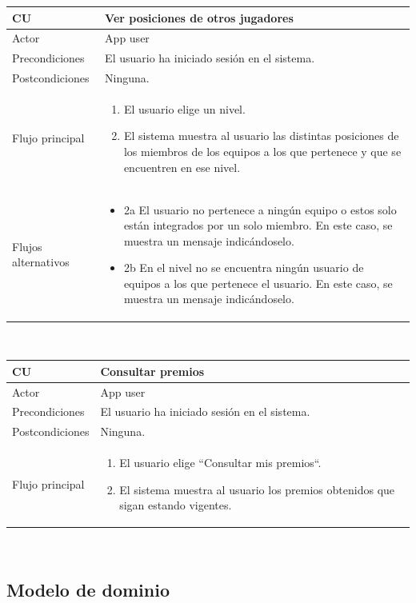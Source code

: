 \documentclass[twoside]{report}
\newcommand\addrow[2]{#1 &#2\\ }
\newcommand\addheading[2]{#1 &#2\\ \hline}
\newcommand\tabularhead{\begin{tabular}{lp{0.7\textwidth}}
\hline
}
\newenvironment{usecase}{\tabularhead}
{\hline\end{tabular}}
\begin{document}
\begin{usecase}
  \addheading{\textbf{CU\arabic{usecase}}}{Ver posiciones de otros jugadores} 
  \addrow{Actor}{App user}
  \addrow{Precondiciones}{El usuario ha iniciado sesión en el sistema.}
  \addrow{Postcondiciones}{Ninguna.}
  \addrow{Flujo principal}{
  		\begin{enumerate}
  		\item El usuario elige un nivel.
  		\item El sistema muestra al usuario las distintas posiciones de los miembros de los equipos a los que pertenece y que se encuentren en ese nivel.
  		\end{enumerate}
  }
  \addrow{Flujos alternativos}{
  		\begin{itemize}
  		\item 2a El usuario no pertenece a ningún equipo o estos solo están integrados por un solo miembro. En este caso,  se muestra un mensaje indicándoselo.
  		\item 2b En el nivel no se encuentra ningún usuario de equipos a los que pertenece el usuario. En este caso, se muestra un mensaje indicándoselo.
  		\end{itemize}
  }
\end{usecase}\\

\begin{usecase}
  \addheading{\textbf{CU\arabic{usecase}}}{Consultar premios} 
  \addrow{Actor}{App user}
  \addrow{Precondiciones}{El usuario ha iniciado sesión en el sistema.}
  \addrow{Postcondiciones}{Ninguna.}
  \addrow{Flujo principal}{
  		\begin{enumerate}
  		\item El usuario elige “Consultar mis premios“.
  		\item El sistema muestra al usuario los premios obtenidos que sigan estando vigentes.
  		\end{enumerate}
  }
\end{usecase}\\

\subsection{Modelo de dominio}
\end{document}
